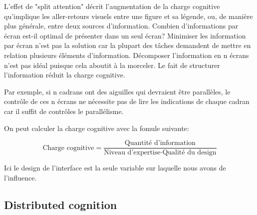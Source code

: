 L'effet de "split attention" d\'ecrit l'augmentation de la charge cognitive qu'implique les aller-retours visuels entre une figure et sa l\'egende, ou, de mani\`ere plus g\'en\'erale, entre deux sources d'information. Combien d'informations par \'ecran est-il optimal de pr\'esenter dans un seul \'ecran? Minimiser les information par \'ecran n'est pas la solution car la plupart des t\^aches demandent de mettre en relation plusieurs \'el\'ements d'information. D\'ecomposer l'information en n \'ecrans n'est pas id\'eal puisque cela aboutit \`a la morceler. Le fait de structurer l'information r\'eduit la charge cognitive. 

\begin{figure}[H]
\centering
{}
\end{figure}

Par exemple, si n cadrans ont des aiguilles qui devraient \^etre parall\`eles, le contr\^ole de ces n \'ecrans ne n\'ecessite pas de lire les indications de chaque cadran car il suffit de contr\^oles le parall\'elisme.


On peut calculer la charge cognitive avec la fomule suivante:

$$\text{Charge cognitive} = \frac{\text{Quantit\'e d'information}}{\text{Niveau d'expertise} \cdot \text{Qualit\'e du design}}$$

Ici le design de l'interface est la seule variable sur laquelle nous avons de l'influence. 

\subsection{Distributed cognition}

